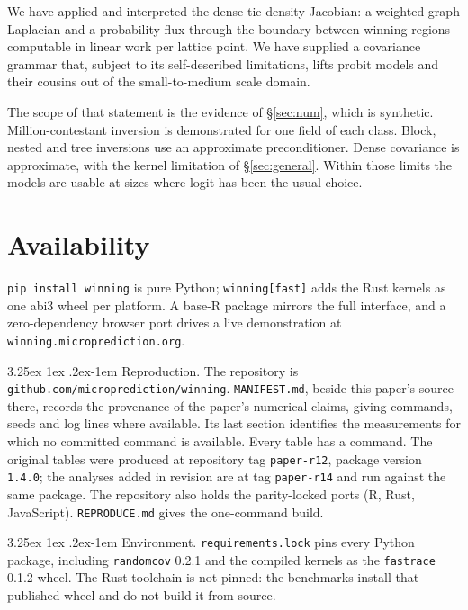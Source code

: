 \documentclass[11pt]{article}
\makeatletter
\renewcommand\paragraph{\@startsection{paragraph}{4}{\z@}%
  {3.25ex \@plus1ex \@minus.2ex}{-1em}%
  {\normalfont\normalsize\itshape}}
\makeatother
\begin{document}
We have applied and interpreted the dense tie-density Jacobian: a weighted graph Laplacian and a probability flux through the boundary between winning regions computable in linear work per lattice point. We have supplied a covariance grammar that, subject to its self-described limitations, lifts probit models and their cousins out of the small-to-medium scale domain.

The scope of that statement is the evidence of \S\ref{sec:num}, which is synthetic. Million-contestant inversion is demonstrated for one field of each class. Block, nested and tree inversions use an approximate preconditioner. Dense covariance is approximate, with the kernel limitation of \S\ref{sec:general}. Within those limits the models are usable at sizes where logit has been the usual choice.


\section{Availability}\label{sec:avail}
\texttt{pip install winning} is pure Python; \texttt{winning[fast]} adds the
Rust kernels as one abi3 wheel per platform. A base-R package mirrors the full
interface, and a zero-dependency browser port drives a live demonstration at
\texttt{winning.microprediction.org}.

\paragraph{Reproduction.} The repository is
\texttt{github.com/microprediction/winning}. \texttt{MANIFEST.md}, beside this paper's
source there, records the provenance of the paper's numerical claims,
giving commands, seeds and log lines where available. Its last section
identifies the measurements for which no committed command is available.
Every table has a command. The original tables were produced
at repository tag \texttt{paper-r12}, package version \texttt{1.4.0};
the analyses added in revision are at tag \texttt{paper-r14} and run
against the same package. The repository also holds the parity-locked
ports (R, Rust, JavaScript). \texttt{REPRODUCE.md} gives the one-command
build.

\paragraph{Environment.} \texttt{requirements.lock} pins every Python
package, including \texttt{randomcov} 0.2.1 and the compiled kernels as
the \texttt{fastrace} 0.1.2 wheel. The Rust toolchain is not pinned: the
benchmarks install that published wheel and do not build it from source.
\end{document}
